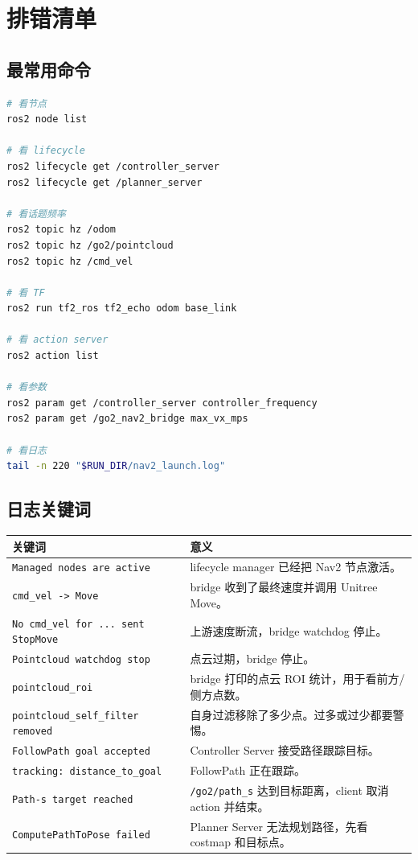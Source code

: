 \documentclass[UTF8,11pt,a4paper,openany]{ctexrep}
\newcommand{\code}[1]{\nolinkurl{#1}}
\newcommand{\topic}[1]{\nolinkurl{#1}}
\begin{document}
\chapter{排错清单}
\label{chap:debugging}

\section{最常用命令}

\begin{lstlisting}[language=bash]
# 看节点
ros2 node list

# 看 lifecycle
ros2 lifecycle get /controller_server
ros2 lifecycle get /planner_server

# 看话题频率
ros2 topic hz /odom
ros2 topic hz /go2/pointcloud
ros2 topic hz /cmd_vel

# 看 TF
ros2 run tf2_ros tf2_echo odom base_link

# 看 action server
ros2 action list

# 看参数
ros2 param get /controller_server controller_frequency
ros2 param get /go2_nav2_bridge max_vx_mps

# 看日志
tail -n 220 "$RUN_DIR/nav2_launch.log"
\end{lstlisting}

\section{日志关键词}

\begin{longtable}{L{0.30\textwidth}L{0.60\textwidth}}
\toprule
关键词 & 意义 \\
\midrule
\code{Managed nodes are active} & lifecycle manager 已经把 Nav2 节点激活。 \\
\code{cmd_vel -> Move} & bridge 收到了最终速度并调用 Unitree Move。 \\
\code{No cmd_vel for ... sent StopMove} & 上游速度断流，bridge watchdog 停止。 \\
\code{Pointcloud watchdog stop} & 点云过期，bridge 停止。 \\
\code{pointcloud_roi} & bridge 打印的点云 ROI 统计，用于看前方/侧方点数。 \\
\code{pointcloud_self_filter removed} & 自身过滤移除了多少点。过多或过少都要警惕。 \\
\code{FollowPath goal accepted} & Controller Server 接受路径跟踪目标。 \\
\code{tracking: distance_to_goal} & FollowPath 正在跟踪。 \\
\code{Path-s target reached} & \topic{/go2/path_s} 达到目标距离，client 取消 action 并结束。 \\
\code{ComputePathToPose failed} & Planner Server 无法规划路径，先看 costmap 和目标点。 \\
\bottomrule
\end{longtable}
\end{document}
